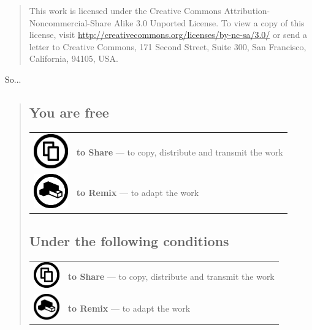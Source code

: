 \documentclass[ipa,twoside]{report}
\begin{document}
\begin{quotation}
This work is licensed under the Creative Commons Attribution-Noncommercial-Share Alike 3.0 Unported License. To view a copy of this license, visit \url{http://creativecommons.org/licenses/by-nc-sa/3.0/} or send a letter to Creative Commons, 171 Second Street, Suite 300, San Francisco, California, 94105, USA.
\end{quotation}

So...
\begin{quotation}

\subsection*{You are free}

\begin{tabular}{ l l }
  \includegraphics[width=4em]{img/sharelarge.png} & \textbf{to Share} --- to copy, distribute and transmit the work  \\
  \includegraphics[width=4em]{img/remixlarge.png} & \textbf{to Remix} --- to adapt the work  \\
\end{tabular}

\subsection*{Under the following conditions}

\begin{tabular}{ l m{40em} }
  \includegraphics[width=3em]{img/sharelarge.png} & \textbf{to Share} --- to copy, distribute and transmit the work  \\
  \includegraphics[width=3em]{img/remixlarge.png} & \textbf{to Remix} --- to adapt the work  \\
\end{tabular}

\end{quotation}
\end{document}
